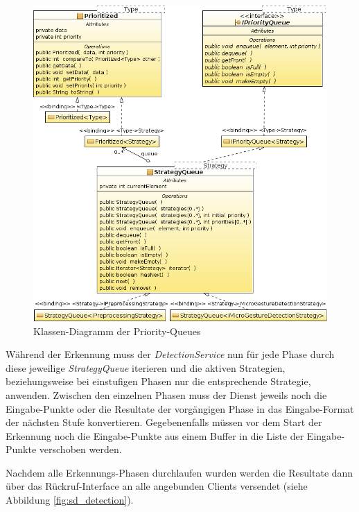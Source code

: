 \begin{figure}[bh!]
   \centering
   \includegraphics[width=\textwidth]{img/uml_cd_queue} 
   \caption{Klassen-Diagramm der Priority-Queues}
   \label{fig:cd_queues}
\end{figure}

Während der Erkennung muss der \emph{DetectionService} nun für jede Phase durch diese jeweilige \emph{StrategyQueue} iterieren und die aktiven Strategien, beziehungsweise bei einstufigen Phasen nur die entsprechende Strategie, anwenden. Zwischen den einzelnen Phasen muss der Dienst jeweils noch die Eingabe-Punkte oder die Resultate der vorgängigen Phase in das Eingabe-Format der nächsten Stufe konvertieren. Gegebenenfalls müssen vor dem Start der Erkennung noch die Eingabe-Punkte aus einem Buffer in die Liste der Eingabe-Punkte verschoben werden.

Nachdem alle Erkennungs-Phasen durchlaufen wurden werden die Resultate dann über das Rückruf-Interface an alle angebunden Clients versendet (siehe Abbildung \ref{fig:sd_detection}).

